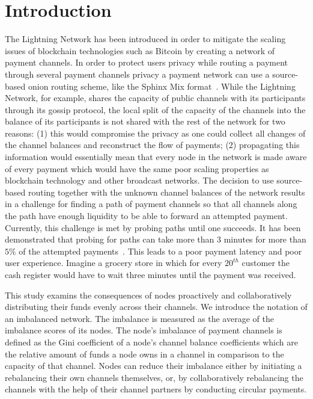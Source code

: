 \documentclass[conference]{IEEEtran}
\begin{document}
\section{Introduction}
The Lightning Network has been introduced in order to mitigate the scaling issues of blockchain technologies such as Bitcoin\cite{poon2016bitcoin} by creating a network of payment channels.
In order to protect users privacy while routing a payment through several payment channels privacy a payment network can use a source-based onion routing scheme, like the Sphinx Mix format~\cite{danezis2009sphinx}.
While the Lightning Network, for example, shares the capacity of public channels with its participants through its gossip protocol, the local split of the capacity of the channels into the balance of its participants is not shared with the rest of the network for two reasons:
(1) this would compromise the privacy as one could collect all changes of the channel balances and reconstruct the flow of payments;
(2) propagating this information would essentially mean that every node in the network is made aware of every payment which would have the same poor scaling properties as blockchain technology and other broadcast networks.
The decision to use source-based routing together with the unknown channel balances of the network results in a challenge for finding a path of payment channels so that all channels along the path have enough liquidity to be able to forward an attempted payment.
Currently, this challenge is met by probing paths until one succeeds.
It has been demonstrated that probing for paths can take more than 3 minutes for more than $5\%$ of the attempted payments~\cite{decker2019lnconf}. This leads to a poor payment latency and poor user experience.
Imagine a grocery store in which for every $20^{th}$ customer the cash register would have to wait three minutes until the payment was received.

This study examins the consequences of nodes proactively and collaboratively distributing their funds evenly across their channels.
We introduce the notation of an imbalanced network.
The imbalance is measured as the average of the imbalance scores of its nodes.
The node's imbalance of payment channels is defined as the Gini coefficient of a node's channel balance coefficients which are the relative amount of funds a node owns in a channel in comparison to the capacity of that channel.
Nodes can reduce their imbalance either by initiating a rebalancing their own channels themselves, or, by collaboratively rebalancing the channels with the help of their channel partners by conducting circular payments.
\end{document}
